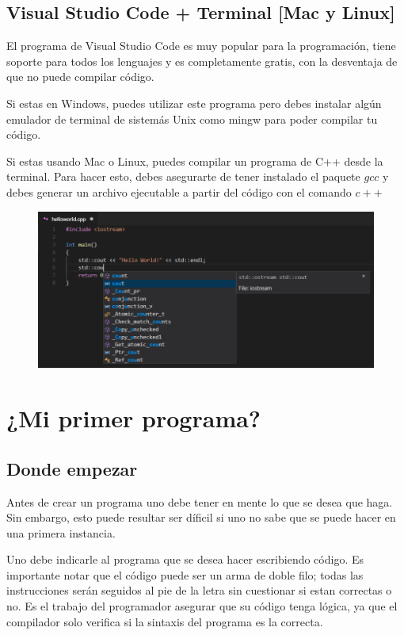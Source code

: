 \documentclass{article}
\begin{document}
\subsection{Visual Studio Code + Terminal [Mac y Linux]}
El programa de Visual Studio Code es muy popular para la programación, tiene soporte para todos los lenguajes y es completamente gratis, con la desventaja de que no puede compilar código.

Si estas en Windows, puedes utilizar este programa pero debes instalar algún emulador de terminal de sistemás Unix como mingw para poder compilar tu código.

Si estas usando Mac o Linux, puedes compilar un programa de C++ desde la terminal. Para hacer esto, debes asegurarte de tener instalado el paquete $gcc$ y debes generar un archivo ejecutable a partir del código con el comando $c++$

\begin{figure}[H]
    \centering
    \includegraphics[width=0.5\paperwidth]{vscode}
\end{figure}

\section{¿Mi primer programa?}

\subsection{Donde empezar}

Antes de crear un programa uno debe tener en mente lo que se desea que haga. Sin embargo, esto puede resultar ser díficil si uno no sabe que se puede hacer en una primera instancia.

Uno debe indicarle al programa que se desea hacer escribiendo código. Es importante notar que el código puede ser un arma de doble filo; todas las instrucciones serán seguidos al pie de la letra sin cuestionar si estan correctas o no. Es el trabajo del programador asegurar que su código tenga lógica, ya que el compilador solo verifica si la sintaxis del programa es la  correcta.
\end{document}
